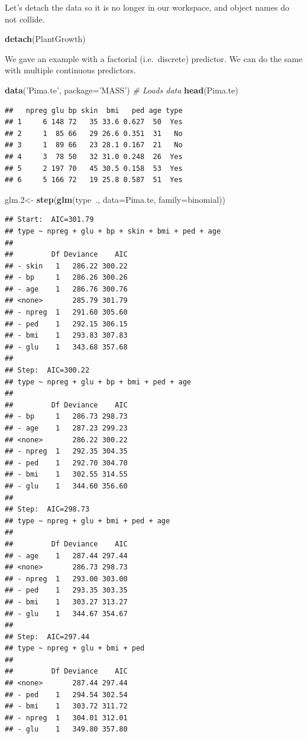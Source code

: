 \documentclass[]{book}
\newenvironment{Shaded}{\begin{snugshade}}{\end{snugshade}}
\newcommand{\KeywordTok}[1]{\textcolor[rgb]{0.13,0.29,0.53}{\textbf{{#1}}}}
\newcommand{\DataTypeTok}[1]{\textcolor[rgb]{0.13,0.29,0.53}{{#1}}}
\newcommand{\FloatTok}[1]{\textcolor[rgb]{0.00,0.00,0.81}{{#1}}}
\newcommand{\StringTok}[1]{\textcolor[rgb]{0.31,0.60,0.02}{{#1}}}
\newcommand{\CommentTok}[1]{\textcolor[rgb]{0.56,0.35,0.01}{\textit{{#1}}}}
\newcommand{\NormalTok}[1]{{#1}}
\theoremstyle{definition}
\theoremstyle{definition}
\theoremstyle{remark}
\begin{document}
Let's detach the data so it is no longer in our workspace, and object
names do not collide.

\begin{Shaded}
\begin{Highlighting}[]
\KeywordTok{detach}\NormalTok{(PlantGrowth)}
\end{Highlighting}
\end{Shaded}

We gave an example with a factorial (i.e.~discrete) predictor. We can do
the same with multiple continuous predictors.

\begin{Shaded}
\begin{Highlighting}[]
\KeywordTok{data}\NormalTok{(}\StringTok{'Pima.te'}\NormalTok{, }\DataTypeTok{package=}\StringTok{'MASS'}\NormalTok{) }\CommentTok{# Loads data}
\KeywordTok{head}\NormalTok{(Pima.te)}
\end{Highlighting}
\end{Shaded}

\begin{verbatim}
##   npreg glu bp skin  bmi   ped age type
## 1     6 148 72   35 33.6 0.627  50  Yes
## 2     1  85 66   29 26.6 0.351  31   No
## 3     1  89 66   23 28.1 0.167  21   No
## 4     3  78 50   32 31.0 0.248  26  Yes
## 5     2 197 70   45 30.5 0.158  53  Yes
## 6     5 166 72   19 25.8 0.587  51  Yes
\end{verbatim}

\begin{Shaded}
\begin{Highlighting}[]
\NormalTok{glm}\FloatTok{.2}\NormalTok{<-}\StringTok{ }\KeywordTok{step}\NormalTok{(}\KeywordTok{glm}\NormalTok{(type~., }\DataTypeTok{data=}\NormalTok{Pima.te, }\DataTypeTok{family=}\NormalTok{binomial))}
\end{Highlighting}
\end{Shaded}

\begin{verbatim}
## Start:  AIC=301.79
## type ~ npreg + glu + bp + skin + bmi + ped + age
## 
##         Df Deviance    AIC
## - skin   1   286.22 300.22
## - bp     1   286.26 300.26
## - age    1   286.76 300.76
## <none>       285.79 301.79
## - npreg  1   291.60 305.60
## - ped    1   292.15 306.15
## - bmi    1   293.83 307.83
## - glu    1   343.68 357.68
## 
## Step:  AIC=300.22
## type ~ npreg + glu + bp + bmi + ped + age
## 
##         Df Deviance    AIC
## - bp     1   286.73 298.73
## - age    1   287.23 299.23
## <none>       286.22 300.22
## - npreg  1   292.35 304.35
## - ped    1   292.70 304.70
## - bmi    1   302.55 314.55
## - glu    1   344.60 356.60
## 
## Step:  AIC=298.73
## type ~ npreg + glu + bmi + ped + age
## 
##         Df Deviance    AIC
## - age    1   287.44 297.44
## <none>       286.73 298.73
## - npreg  1   293.00 303.00
## - ped    1   293.35 303.35
## - bmi    1   303.27 313.27
## - glu    1   344.67 354.67
## 
## Step:  AIC=297.44
## type ~ npreg + glu + bmi + ped
## 
##         Df Deviance    AIC
## <none>       287.44 297.44
## - ped    1   294.54 302.54
## - bmi    1   303.72 311.72
## - npreg  1   304.01 312.01
## - glu    1   349.80 357.80
\end{verbatim}
\end{document}
